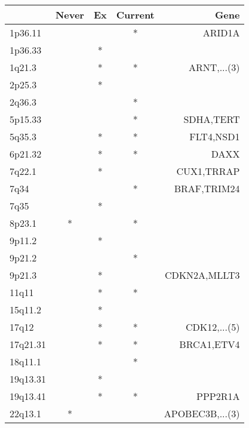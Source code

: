 \begin{tabular}{lcccr}
\toprule
{} & Never & Ex & Current &             Gene \\
\midrule
1p36.11  &       &    &       * &           ARID1A \\
1p36.33  &       &  * &         &                  \\
1q21.3   &       &  * &       * &      ARNT,...(3) \\
2p25.3   &       &  * &         &                  \\
2q36.3   &       &    &       * &                  \\
5p15.33  &       &    &       * &        SDHA,TERT \\
5q35.3   &       &  * &       * &        FLT4,NSD1 \\
6p21.32  &       &  * &       * &             DAXX \\
7q22.1   &       &  * &         &       CUX1,TRRAP \\
7q34     &       &    &       * &      BRAF,TRIM24 \\
7q35     &       &  * &         &                  \\
8p23.1   &     * &    &       * &                  \\
9p11.2   &       &  * &         &                  \\
9p21.2   &       &    &       * &                  \\
9p21.3   &       &  * &         &     CDKN2A,MLLT3 \\
11q11    &       &  * &       * &                  \\
15q11.2  &       &  * &         &                  \\
17q12    &       &  * &       * &     CDK12,...(5) \\
17q21.31 &       &  * &       * &       BRCA1,ETV4 \\
18q11.1  &       &    &       * &                  \\
19q13.31 &       &  * &         &                  \\
19q13.41 &       &  * &       * &          PPP2R1A \\
22q13.1  &     * &    &         &  APOBEC3B,...(3) \\
\bottomrule
\end{tabular}
